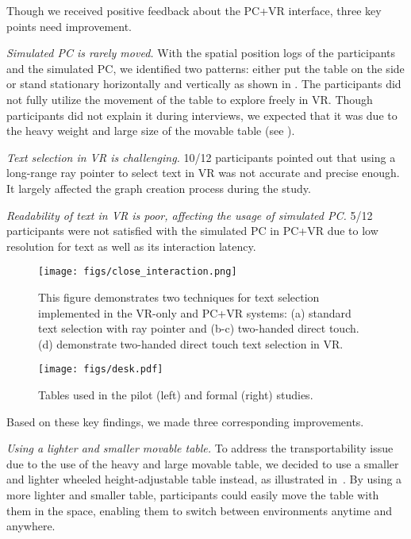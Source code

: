 Though we received positive feedback about the PC+VR interface, three key points need improvement.

\vspace{1mm}\noindent\textit{Simulated PC is rarely moved.} With the spatial position logs of the participants and the simulated PC, we identified two patterns: either put the table on the side or stand stationary horizontally and vertically as shown in . The participants did not fully utilize the movement of the table to explore freely in VR. Though participants did not explain it during interviews, we expected that it was due to the heavy weight and large size of the movable table (see ).

\vspace{1mm}\noindent\textit{Text selection in VR is challenging.} 10/12 participants pointed out that using a long-range ray pointer to select text in VR was not accurate and precise enough. It largely affected the graph creation process during the study. 

\vspace{1mm}\noindent\textit{Readability of text in VR is poor, affecting the usage of simulated PC.} 5/12 participants were not satisfied with the simulated PC in PC+VR due to low resolution for text as well as its interaction latency. 

\begin{figure}
\centering
\texttt{[image: figs/close\_interaction.png]}
\caption{This figure demonstrates two techniques for text selection implemented in the VR-only and PC+VR systems: (a) standard text selection with ray pointer and (b-c) two-handed direct touch. (d) demonstrate two-handed direct touch text selection in VR.}
\label{fig:close_interaction}
\end{figure}

\begin{figure}
\centering
\texttt{[image: figs/desk.pdf]}
\caption{Tables used in the pilot (left) and formal (right) studies.}
\label{fig:setup_new}
\end{figure}

Based on these key findings, we made three corresponding improvements.

\vspace{1mm}\noindent\textit{Using a lighter and smaller movable table.}
To address the transportability issue due to the use of the heavy and large movable table, we decided to use a smaller and lighter wheeled height-adjustable table instead, as illustrated in~. 
By using a more lighter and smaller table, participants could easily move the table with them in the space, enabling them to switch between environments anytime and anywhere.

